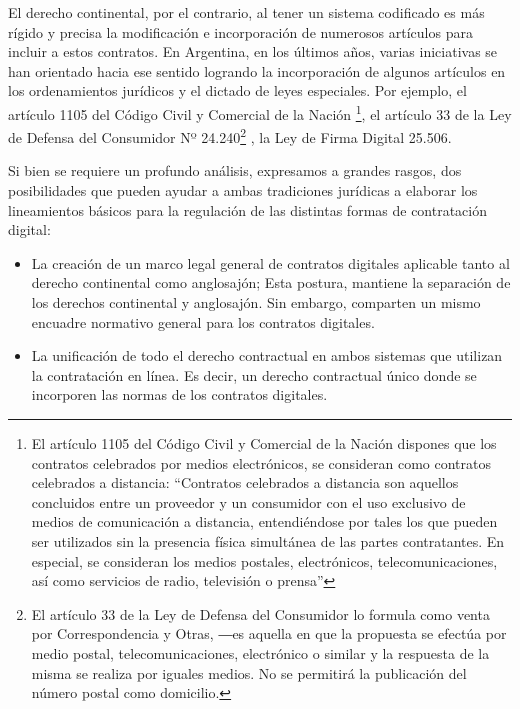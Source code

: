\documentclass[12pt]{report} %
\begin{document}
\begin{itemize}
El derecho continental, por el contrario, al tener un sistema codificado es más rígido y precisa la modificación e incorporación de numerosos artículos para incluir a estos contratos. En Argentina, en los últimos años, varias iniciativas se han orientado hacia ese sentido logrando la incorporación de algunos artículos en los ordenamientos jurídicos y el dictado de leyes especiales. Por ejemplo, el artículo 1105 del Código Civil y Comercial de la Nación \footnote{El artículo 1105 del Código Civil y Comercial de la Nación dispones que los contratos celebrados por medios electrónicos, se consideran como contratos celebrados a distancia: “Contratos celebrados a distancia son aquellos concluidos entre un proveedor y un consumidor con el uso exclusivo de medios de comunicación a distancia, entendiéndose por tales los que pueden ser utilizados sin la presencia física simultánea de las partes contratantes. En especial, se consideran los medios postales, electrónicos, telecomunicaciones, así como servicios de radio, televisión o prensa”},  el artículo 33 de la Ley de Defensa del Consumidor Nº 24.240\footnote{El artículo 33 de la Ley de Defensa del Consumidor lo formula como venta por Correspondencia y Otras, ―es aquella en que la propuesta se efectúa por medio postal, telecomunicaciones, electrónico o similar y la respuesta de la misma se realiza por iguales medios. No se permitirá la publicación del número postal como domicilio.} , la Ley de Firma Digital 25.506.

Si bien  se  requiere  un  profundo análisis,  expresamos a grandes rasgos,  dos posibilidades que pueden ayudar a ambas tradiciones jurídicas a elaborar los lineamientos básicos para la regulación de las distintas formas de contratación digital:

\begin{itemize}
    \item La creación de un marco legal general de contratos digitales aplicable tanto al derecho continental como anglosajón; Esta postura, mantiene la separación de los derechos continental y anglosajón. Sin embargo, comparten un mismo encuadre normativo general para los contratos digitales.
    \item La unificación de todo el derecho contractual en ambos sistemas que utilizan la contratación en línea. Es decir, un derecho contractual único donde se incorporen las normas de los contratos digitales.
\end{itemize}


\end{itemize}
\end{document}
